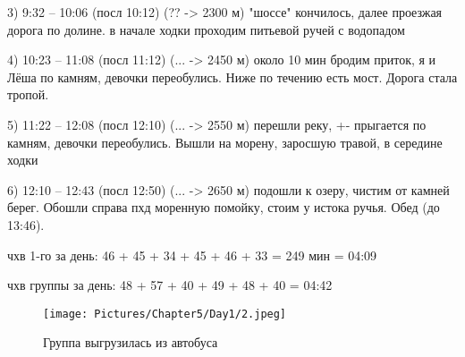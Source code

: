 3) 9:32 -- 10:06 (посл 10:12) (?? -> 2300 м) "шоссе" кончилось, далее проезжая дорога по долине. в начале ходки проходим питьевой ручей с водопадом

4) 10:23 -- 11:08 (посл 11:12) (... -> 2450 м) около 10 мин бродим приток, я и Лёша по камням, девочки переобулись. Ниже по течению есть мост. Дорога стала тропой.

5) 11:22 -- 12:08 (посл 12:10) (... -> 2550 м) перешли реку, +- прыгается по камням, девочки переобулись. Вышли на морену, заросшую травой, в середине ходки

6) 12:10 -- 12:43 (посл 12:50) (... -> 2650 м) подошли к озеру, чистим от камней берег. Обошли справа пхд моренную помойку, стоим у истока ручья. Обед (до 13:46).

чхв 1-го за день: 46 + 45 + 34 + 45 + 46 + 33 = 249 мин = 04:09

чхв группы за день: 48 + 57 + 40 + 49 + 48 + 40 = 04:42

    \begin{figure}[hb]
        \centering
        \texttt{[image: Pictures/Chapter5/Day1/2.jpeg]}
        \caption{Группа выгрузилась из автобуса}
        \label{fig:Day1_2}
    \end{figure}

    \FloatBarrier
